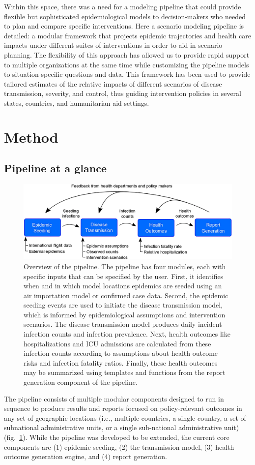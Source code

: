 Within this space, there was a need for a modeling pipeline that could provide flexible but sophisticated epidemiological models to decision-makers who needed to plan and compare specific interventions. Here a scenario modeling pipeline is detailed: a modular framework that projects epidemic trajectories and health care impacts under different suites of interventions in order to aid in scenario planning. The flexibility of this approach has allowed us to provide rapid support to multiple organizations at the same time while customizing the pipeline models to situation-specific questions and data. This framework has been used to provide tailored estimates of the relative impacts of different scenarios of disease transmission, severity, and control, thus guiding intervention policies in several states, countries, and humanitarian aid settings.

\section{Method}
\subsection{Pipeline at a glance}
\begin{figure}[!htb]
    \centering
    \includegraphics[width = .8\textwidth]{fig_pipeline/fig1a}
    \caption[Overview of the pipeline]{Overview of the pipeline. The pipeline has four modules, each with specific inputs that can be specified by the user. First, it identifies when and in which model locations epidemics are seeded using an air importation model or confirmed case data. Second, the epidemic seeding events are used to initiate the disease transmission model, which is informed by epidemiological assumptions and intervention scenarios. The disease transmission model produces daily incident infection counts and infection prevalence. Next, health outcomes like hospitalizations and ICU admissions are calculated from these infection counts according to assumptions about health outcome risks and infection fatality ratios. Finally, these health outcomes may be summarized using templates and functions from the report generation component of the pipeline.}
    \label{fig:pipeline-modules}
\end{figure}
The pipeline consists of multiple modular components designed to run in sequence to produce results and reports focused on policy-relevant outcomes in any set of geographic locations (i.e., multiple countries, a single country, a set of subnational administrative units, or a single sub-national administrative unit) (fig.~\ref{fig:pipeline-modules}). While the pipeline was developed to be extended, the current core components are (1) epidemic seeding, (2) the transmission model, (3) health outcome generation engine, and (4) report generation. 

